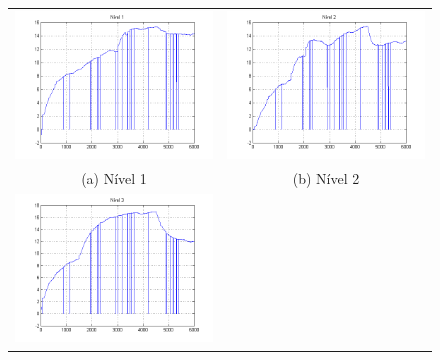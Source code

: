 \begin{figure}[H]
	\centering
	\begin{tabular}{cc}
		\includegraphics[height=0.15\paperheight,keepaspectratio]{img/sim3_h1.png} &
		\includegraphics[height=0.15\paperheight,keepaspectratio]{img/sim3_h2.png} \\
		(a) Nível 1 &
		(b) Nível 2 \\
		\includegraphics[height=0.15\paperheight,keepaspectratio]{img/sim3_h3.png} &

\end{tabular}
\end{figure}
